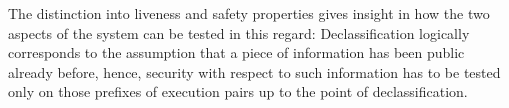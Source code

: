 \documentclass{llncs}
\begin{document}
The distinction into liveness and safety properties gives insight in how the two aspects of the system can be tested in this regard:
Declassification logically corresponds to the assumption that a piece of information has been public already before,
hence, security with respect to such information has to be tested only on those prefixes of execution pairs up to the point of declassification.
\end{document}
